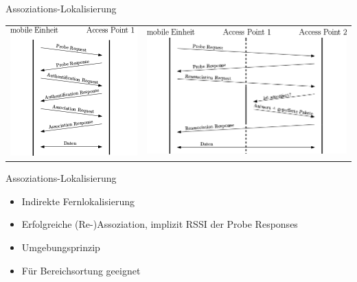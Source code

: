 \documentclass[18pt]{beamer}
\begin{document}
\begin{frame}{Assoziations-Lokalisierung}
	\begin{tabular}{cc}
		\includegraphics[height=0.5\textheight]{images/reupper.png} & \includegraphics[height=0.5\textheight]{images/relower.png}\\
	\end{tabular}
	\begin{block}{Assoziations-Lokalisierung}
		\begin{itemize}
			\item Indirekte Fernlokalisierung
			\item Erfolgreiche (Re-)Assoziation, implizit RSSI der Probe Responses
			\item Umgebungsprinzip
			\item Für Bereichsortung geeignet
		\end{itemize}
	\end{block}
\end{frame}
\end{document}
